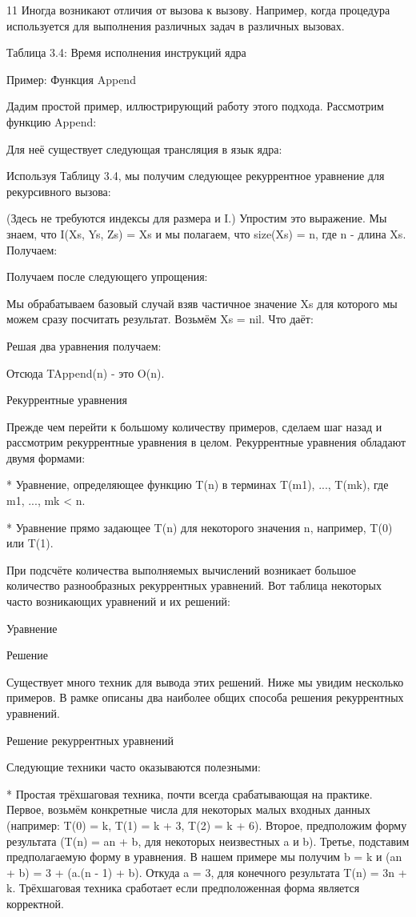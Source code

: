 11 Иногда возникают отличия от вызова к вызову. Например, когда процедура используется для выполнения различных задач в различных вызовах.

Таблица 3.4: Время исполнения инструкций ядра

Пример: Функция Append

Дадим простой пример, иллюстрирующий работу этого подхода. Рассмотрим функцию Append:

Для неё существует следующая трансляция в язык ядра:

Используя Таблицу 3.4, мы получим следующее рекуррентное уравнение для рекурсивного вызова:

(Здесь не требуются индексы для размера и I.) Упростим это выражение. Мы знаем, что I({Xs, Ys, Zs}) = {Xs} и мы полагаем, что size({Xs}) = n, где n - длина Xs. Получаем:

Получаем после следующего упрощения:

Мы обрабатываем базовый случай взяв частичное значение Xs для которого мы можем сразу посчитать результат. Возьмём Xs = nil. Что даёт:

Решая два уравнения получаем:

Отсюда TAppend(n) - это O(n).

Рекуррентные уравнения

Прежде чем перейти к большому количеству примеров, сделаем шаг назад и рассмотрим рекуррентные уравнения в целом. Рекуррентные уравнения обладают двумя формами:

* Уравнение, определяющее функцию T(n) в терминах T(m1), ..., T(mk), где m1, ..., mk < n.

* Уравнение прямо задающее T(n) для некоторого значения n, например, T(0) или T(1).

При подсчёте количества выполняемых вычислений возникает большое количество разнообразных рекуррентных уравнений. Вот таблица некоторых часто возникающих уравнений и их решений:

Уравнение

Решение

Существует много техник для вывода этих решений. Ниже мы увидим несколько примеров. В рамке описаны два наиболее общих способа решения рекуррентных уравнений.

Решение рекуррентных уравнений

Следующие техники часто оказываются полезными:

* Простая трёхшаговая техника, почти всегда срабатывающая на практике. Первое, возьмём конкретные числа для некоторых малых входных данных (например: T(0) = k, T(1) = k + 3, T(2) = k + 6). Второе, предположим форму результата (T(n) = an + b, для некоторых неизвестных a и b). Третье, подставим предполагаемую форму в уравнения. В нашем примере мы получим b = k и (an + b) = 3 + (a.(n - 1) + b). Откуда a = 3, для конечного результата T(n) = 3n + k. Трёхшаговая техника сработает если предположенная форма является корректной.

